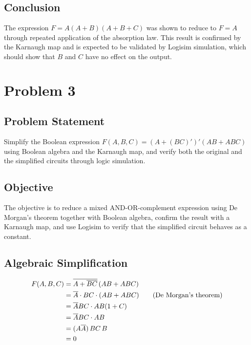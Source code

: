 \documentclass[12pt,a4paper]{article}
\begin{document}
\subsection*{Conclusion}
The expression $F = A(A+B)(A+B+C)$ was shown to reduce to $F = A$ through repeated application of the absorption law. This result is confirmed by the Karnaugh map and is expected to be validated by Logisim simulation, which should show that $B$ and $C$ have no effect on the output.

\clearpage
\section*{Problem 3}

\subsection*{Problem Statement}
Simplify the Boolean expression $F(A,B,C) = \left(A+(BC)'\right)'(AB + ABC)$ using Boolean algebra and the Karnaugh map, and verify both the original and the simplified circuits through logic simulation.

\subsection*{Objective}
The objective is to reduce a mixed AND-OR-complement expression using De Morgan's theorem together with Boolean algebra, confirm the result with a Karnaugh map, and use Logisim to verify that the simplified circuit behaves as a constant.

\subsection*{Algebraic Simplification}
\begin{align*}
F(A,B,C) &= \overline{A + \overline{BC}}\,(AB + ABC) \\
         &= \overline{A} \cdot BC \cdot (AB + ABC) \qquad \text{(De Morgan's theorem)} \\
         &= \overline{A} BC \cdot AB(1+C) \\
         &= \overline{A} BC \cdot AB \\
         &= (A\overline{A})\,BC\,B \\
         &= 0
\end{align*}
\end{document}
